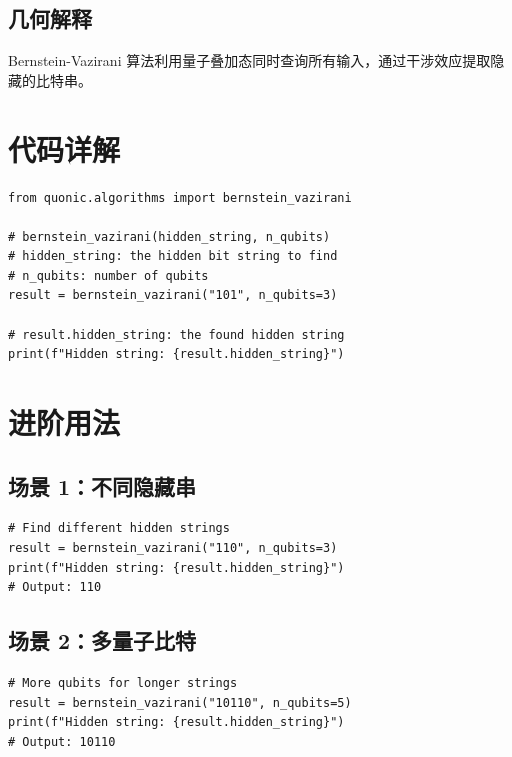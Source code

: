 \documentclass[12pt,a4paper]{article}
\begin{document}
\subsection{几何解释}

Bernstein-Vazirani 算法利用量子叠加态同时查询所有输入，通过干涉效应提取隐藏的比特串。

\section{代码详解}

\begin{lstlisting}[style=python]
from quonic.algorithms import bernstein_vazirani

# bernstein_vazirani(hidden_string, n_qubits)
# hidden_string: the hidden bit string to find
# n_qubits: number of qubits
result = bernstein_vazirani("101", n_qubits=3)

# result.hidden_string: the found hidden string
print(f"Hidden string: {result.hidden_string}")
\end{lstlisting}

\section{进阶用法}

\subsection{场景 1：不同隐藏串}

\begin{lstlisting}[style=python]
# Find different hidden strings
result = bernstein_vazirani("110", n_qubits=3)
print(f"Hidden string: {result.hidden_string}")
# Output: 110
\end{lstlisting}

\subsection{场景 2：多量子比特}

\begin{lstlisting}[style=python]
# More qubits for longer strings
result = bernstein_vazirani("10110", n_qubits=5)
print(f"Hidden string: {result.hidden_string}")
# Output: 10110
\end{lstlisting}

\end{document}
